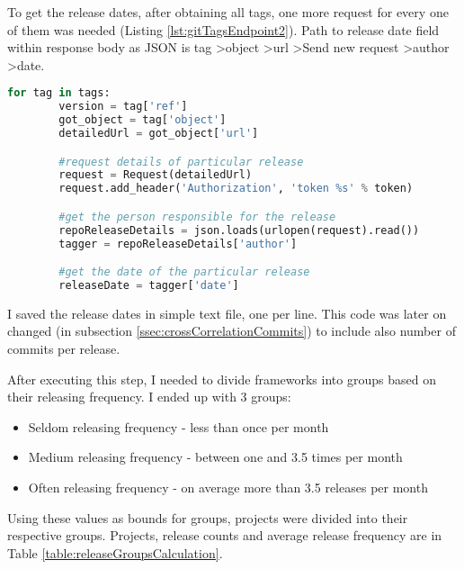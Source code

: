 To get the release dates, after obtaining all tags, one more request for every one of them was needed (Listing \ref{lst:gitTagsEndpoint2}). Path to release date field within response body as JSON is tag \textgreater  object \textgreater  url \textgreater  Send new request \textgreater  author \textgreater  date.
\newpage
\begin{lstlisting}[caption={Requesting tag details and accessing release date},label={lst:gitTagsEndpoint2},language=Python]
	for tag in tags:
		version = tag['ref']
		got_object = tag['object']
		detailedUrl = got_object['url']

		#request details of particular release
		request = Request(detailedUrl)
		request.add_header('Authorization', 'token %s' % token)

		#get the person responsible for the release
		repoReleaseDetails = json.loads(urlopen(request).read())
		tagger = repoReleaseDetails['author']

		#get the date of the particular release
		releaseDate = tagger['date']
\end{lstlisting}

I saved the release dates in simple text file, one per line. This code was later on changed (in subsection \ref{ssec:crossCorrelationCommits}) to include also number of commits per release.

After executing this step, I needed to divide frameworks into groups based on their releasing frequency. I ended up with 3 groups:
\begin{itemize}
\item{Seldom releasing frequency} - less than once per month
\item{Medium releasing frequency} - between one and 3.5 times per month
\item{Often releasing frequency} - on average more than 3.5 releases per month
\end{itemize}

Using these values as bounds for groups, projects were divided into their respective groups. Projects, release counts and average release frequency are in Table \ref{table:releaseGroupsCalculation}.


